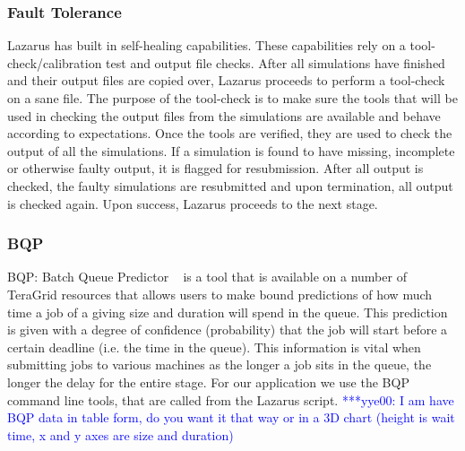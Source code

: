 \documentclass[conference,final]{IEEEtran}
\newcommand{\yaakoub}[0]{}
\newcommand{\yyenote}[1]{ {\textcolor{blue} { ***yye00: #1 }}}
\begin{document}
\subsubsection{Fault Tolerance}
Lazarus has built in self-healing capabilities. These capabilities rely on
a tool-check/calibration test and output file checks. After all simulations
have finished and their output files are copied over, Lazarus proceeds to
perform a tool-check on a sane file. The purpose of the tool-check is to make sure
the tools that will be used in checking the output files from the simulations
are available and behave according to expectations. Once the tools are verified,
they are used to check the output of all the simulations. If a simulation is found
to have missing, incomplete or otherwise faulty output, it is flagged for resubmission.
After all output is checked, the faulty simulations are resubmitted and upon termination,
all output is checked again. Upon success, Lazarus proceeds to the next stage.


\subsubsection{BQP}
BQP: Batch Queue Predictor ~\cite{bqp} is a tool that is available on
a number of TeraGrid resources that allows users to make bound
predictions of how much time a job of a giving size and duration will
spend in the queue.  This prediction is given with a degree of
confidence (probability) that the job will start before a certain
deadline (i.e. the time in the queue).  This information is vital when
submitting jobs to various machines as the longer a job sits in the
queue, the longer the delay for the entire stage.  For our application
we use the BQP command line tools, that are called from the Lazarus
script.  \yyenote{I am have BQP data in table form, do you want it
  that way or in a 3D chart (height is wait time, x and y axes are
  size and duration)}

\end{document}
